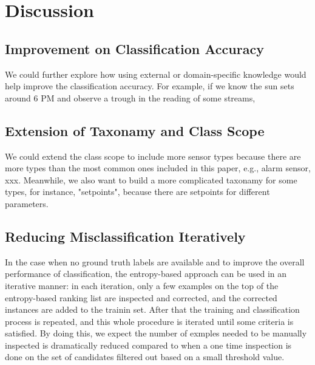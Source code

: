 \section{Discussion}
\subsection{Improvement on Classification Accuracy}
We could further explore how using external or domain-specific knowledge would help improve the classification accuracy. For example, if we know the sun sets around 6 PM and observe a trough in the reading of some streams, 

\subsection{Extension of Taxonamy and Class Scope}
We could extend the class scope to include more sensor types because there are more types than the most common ones included in this paper, e.g., alarm sensor, xxx. Meanwhile, we also want to build a more complicated taxonamy for some types, for instance, "setpoints", because there are setpoints for different parameters.  

\subsection{Reducing Misclassification Iteratively}
In the case when no ground truth labels are available and to improve the overall performance of classification, the entropy-based approach can be used in an iterative manner: in each iteration, only a few examples on the top of the entropy-based ranking list are inspected and corrected, and the corrected instances are added to the trainin set. After that the training and classification process is repeated, and this whole procedure is iterated until some criteria is satisfied.
By doing this, we expect the number of exmples needed to be manually inspected is dramatically reduced compared to when a one time inspection is done on the set of candidates filtered out based on a small threshold value.
